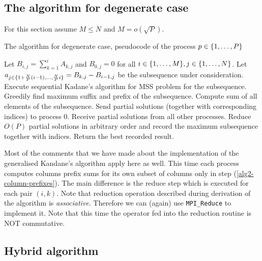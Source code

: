 \subsection*{The algorithm for degenerate case}

For this section assume $M \leq N$ and $M = o(\sqrt{P})$.

\begin{algorithm}[h!]
    \caption{The algorithm for degenerate case, pseudocode of the process $p \in \{ 1, \dots, P \}$}
    \begin{algorithmic}[1]
        \State Let $B_{i, j} = \sum_{k = 1}^{i}{A_{k, j}}$ and $B_{0, j} = 0$ for all $i \in \{ 1, \dots, M \}, j \in \{ 1, \dots, N \}$. \label{alg2-column-prefixes}
                \State Let $a_{j \in \{ 1 + \frac{N}{P} (i - 1), \dots, \frac{N}{P} i \}} = B_{k, j} - B_{i-1, j}$ be the subsequence under consideration.
                \State Execute sequential Kadane's algorithm for MSS problem for the subsequence.
                \State Greedily find maximum suffix and prefix of the subsequence.
                \State Compute sum of all elements of the subsequence.
                    \State Send partial solutions (together with corresponding indices) to process $0$.
                \Else
                    \State Receive partial solutions from all other processes.
                    \State Reduce $O(P)$ partial solutions in arbitrary order and record the maximum subsequence together with indices.
                \EndIf
            \EndFor
        \EndFor
            \State Return the best recorded result.
        \EndIf
    \end{algorithmic}
\end{algorithm}

Most of the comments that we have made about the implementation of the generalised Kandane's algorithm apply here as well.
This time each process computes columns prefix sums for its own subset of columns only in step (\ref{alg2-column-prefixes}).
The main difference is the reduce step which is executed for each pair $(i, k)$.
Note that reduction operation described during derivation of the algorithm is \emph{associative}.
Therefore we can (again) use \verb+MPI_Reduce+ to implement it.
Note that this time the operator fed into the reduction routine is NOT commutative.

\subsection*{Hybrid algorithm}

